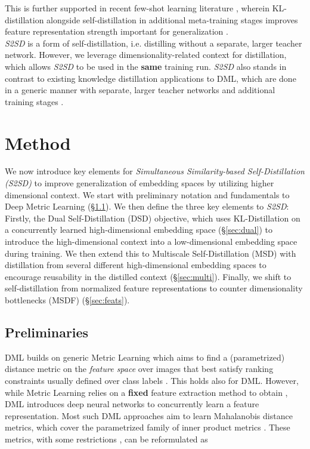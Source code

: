 \documentclass{article} \usepackage{arxiv_style,times}
\begin{document}
This is further supported in recent few-shot learning literature \citep{tian2020rethinking}, wherein KL-distillation alongside self-distillation \citep{furlanello2018born} in additional meta-training stages improves feature representation strength important for generalization \citep{raghu2019rapid}.\\
\textit{S2SD} is a form of self-distillation, i.e. distilling without a separate, larger teacher network. However, we leverage dimensionality-related context for distillation, which allows \textit{S2SD} to be used in the \textbf{same} training run. 
\textit{S2SD} also stands in contrast to existing knowledge distillation applications to DML, which are done in a generic manner with separate, larger teacher networks and additional training stages \citep{chen2017darkrank,Yu_2019,Han2019DeepDM,laskar2020dataefficient}.






\section{Method}\label{sec:methods}
We now introduce key elements for \textit{Simultaneous Similarity-based Self-Distillation }\textit{(S2SD)} to improve generalization of embedding spaces by utilizing higher dimensional context. We start with preliminary notation and fundamentals to Deep Metric Learning (\S\ref{sec:prelim}). We then define the three key elements to \textit{S2SD}: Firstly, the Dual Self-Distillation (DSD) objective, which uses KL-Distillation on a concurrently learned high-dimensional embedding space (\S\ref{sec:dual}) to introduce the high-dimensional context into a low-dimensional embedding space during training. We then extend this to Multiscale Self-Distillation (MSD) with distillation from several different high-dimensional embedding spaces to encourage reusability in the distilled context (\S\ref{sec:multi}). Finally, we shift to self-distillation from normalized feature representations to counter dimensionality bottlenecks (MSDF) (\S\ref{sec:feats}).

\subsection{Preliminaries}
\label{sec:prelim}
DML builds on generic Metric Learning which aims to find a (parametrized) distance metric  on the \textit{feature space}  over images  that best satisfy ranking constraints usually defined over class labels . This holds also for DML. However, while Metric Learning relies on a \textbf{fixed} feature extraction method to obtain , DML introduces deep neural networks to concurrently learn a feature representation. 
Most such DML approaches aim to learn Mahalanobis distance metrics, which cover the parametrized family of inner product metrics \citep{surez2018tutorial,chen2019curvilinear}. 
These metrics, with some restrictions \citep{surez2018tutorial}, can be reformulated as
\end{document}
